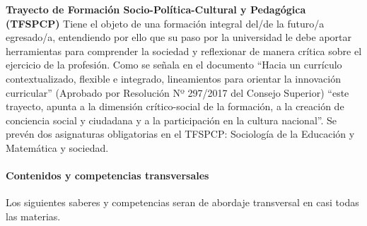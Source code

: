 \documentclass[a4paper, 12pt]{article}
\begin{document}
\begin{description}
\item{\textbf{Trayecto de Formación Socio-Política-Cultural y Pedagógica (TFSPCP)}}  Tiene el objeto de una formación integral del/de la futuro/a egresado/a,  entendiendo por ello que su paso por la universidad le debe aportar herramientas para comprender la sociedad y reflexionar de manera crítica sobre el ejercicio de la profesión. Como se señala en el documento  ``Hacia un currículo contextualizado, 
flexible e integrado, lineamientos para orientar la innovación curricular'' (Aprobado por Resolución Nº 297/2017 del Consejo Superior) ``este trayecto, apunta a la dimensión crítico-social de la formación, a la creación de conciencia social y ciudadana y a la participación en la cultura nacional''. Se prevén dos asignaturas obligatorias en el   TFSPCP:  Sociología de la Educación y Matemática y sociedad.







\end{description}



\paragraph{Contenidos y competencias transversales}

Los siguientes  saberes y competencias seran de abordaje transversal en casi todas las materias. 
\end{document}
